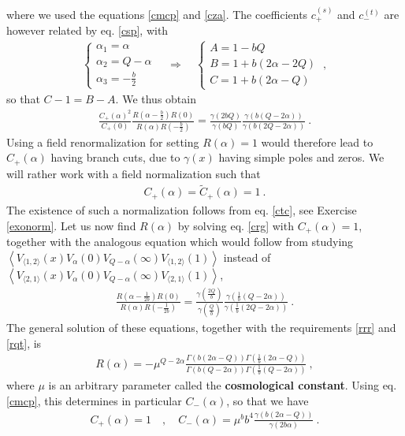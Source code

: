 \documentclass[12pt,a4paper,notitlepage]{report}
\numberwithin{equation}{section}
\theoremstyle{break}
\begin{document}
where we used the equations \eqref{cmcp} and \eqref{cza}.
The coefficients $c^{(s)}_+$ and $c^{(t)}_-$ are however related by eq. \eqref{csp}, with
\begin{align}
 \left\{\begin{array}{l}  \alpha_1 = \alpha \\ \alpha_2 = Q-\alpha \\ \alpha_3 = -\frac{b}{2} \end{array}\right. \quad \Rightarrow \quad \left\{\begin{array}{l}  A = 1-bQ \\ B = 1+b(2\alpha-2Q) \\ C=1+b(2\alpha-Q) \end{array}\right.  \ ,
\end{align}
so that $C-1=B-A$.
We thus obtain
\begin{align}
 \frac{C_+(\alpha)^2}{C_+(0)} \frac{R(\alpha-\tfrac{b}{2})R(0)}{R(\alpha)R(-\tfrac{b}{2})} = 
\frac{\gamma(2bQ)}{\gamma(bQ)} \frac{\gamma(b(Q-2\alpha))}{\gamma(b(2Q-2\alpha))}\ .
\label{crg}
\end{align}
Using a field renormalization for setting $R(\alpha)=1$ would therefore lead to $C_+(\alpha)$ having branch cuts, due to $\gamma(x)$ having simple poles and zeros.
We will rather work with a field normalization such that  
\begin{align}
 \boxed{C_+(\alpha) = \tilde{C}_+(\alpha) = 1}\ . 
\label{cco}
\end{align}
The existence of such a normalization follows from eq. \eqref{ctc}, see Exercise \ref{exonorm}.
Let us now find $R(\alpha)$ by solving eq. \eqref{crg} with $C_+(\alpha)=1$, together with the analogous equation which would follow from studying $ \left\langle V_{\langle 1,2 \rangle}(x) V_\alpha(0) V_{Q-\alpha}(\infty) V_{\langle 1,2 \rangle}(1)\right\rangle$ instead of $\left\langle V_{\langle 2,1 \rangle}(x) V_\alpha(0) V_{Q-\alpha}(\infty) V_{\langle 2,1 \rangle}(1)\right\rangle$, 
\begin{align}
  \frac{R(\alpha-\tfrac{1}{2b})R(0)}{R(\alpha)R(-\tfrac{1}{2b})} = \frac{\gamma(\frac{2Q}{b})}{\gamma(\frac{Q}{b})} \frac{\gamma(\frac{1}{b}(Q-2\alpha))}{\gamma(\frac{1}{b}(2Q-2\alpha))}\ .
\end{align}
The general solution of these equations, together with the requirements \eqref{rrr} and \eqref{rqt}, is
\begin{align}
 \boxed{R(\alpha) = -\mu^{Q-2\alpha} \frac{\Gamma(b(2\alpha-Q))\Gamma(\frac{1}{b}(2\alpha-Q))}{\Gamma(b(Q-2\alpha))\Gamma(\frac{1}{b}(Q-2\alpha))}}\ ,
\label{ram}
\end{align}
where $\mu$ is an arbitrary parameter called the \textbf{\boldmath cosmological constant}.
Using eq. \eqref{cmcp}, this determines in particular $C_-(\alpha)$, so that we have
\begin{align}
 C_+(\alpha)=1 \quad , \quad C_-(\alpha) = \mu^b b^4 \frac{\gamma(b(2\alpha-Q))}{\gamma(2b\alpha)}\ .
\label{cpm}
\end{align}
\end{document}
